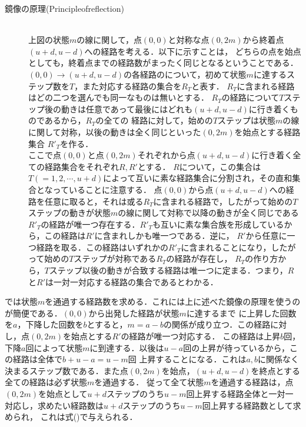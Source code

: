 \documentclass[a4j,papersize,disablejfam,slide,14pt]{jsarticle}
\newcommand{\qed}{%
	\relax\ifmmode
		\eqno{%
		\setlength{\fboxsep}{2pt}\setlength{\fboxrule}{0.3pt}
		\fcolorbox{black}{black}{\rule[2pt]{0pt}{1ex}}}
	\else
		\begingroup
		\setlength{\fboxsep}{2pt}\setlength{\fboxrule}{0.3pt}
		\hfill\fcolorbox{black}{black}{\rule[2pt]{0pt}{1ex}}
		\endgroup
	\fi}
\begin{document}
    \begin{description}
	\item[鏡像の原理{\rm (Principle\quad of\quad reflection)}]\mbox{}\\
    	上図の状態$m$の線に関して，点$(0, 0)$と対称な点$(0, 2m)$から終着点$(u+d,u-d)$への経路を考える．以下に示すことは，
        どちらの点を始点としても，終着点までの経路数がまったく同じとなるということである．\\
    	$(0,0) \to (u+d,u-d)$の各経路のについて，初めて状態$m$に達するステップ数を$T$，また対応する経路の集合を$R_T$と表す．
        $R_T$に含まれる経路はどの二つを選んでも同一なものは無いとする．
    	$R_T$の経路について$T$ステップ後の動きは任意であって最後にはどれも$(u+d, u-d)$に行き着くものであるから，$R_T$の全ての
        経路に対して，始めの$T$ステップは状態$m$の線に関して対称，以後の動きは全く同じといった$(0,2m)$を始点とする経路集合
        $R'_T$を作る．\\
        ここで点$(0, 0)$と点$(0, 2m)$それぞれから点$(u+d,u-d)$に行き着く全ての経路集合をそれぞれ$R,R'$とする．
    	$R$について，この集合は$T(=1,2,\cdots,u+d)$によって互いに素な経路集合に分割され，その直和集合となっていることに注意する．
    	点$(0, 0)$から点$(u+d,u-d)$への経路を任意に取ると，それは或る$R_T$に含まれる経路で，したがって始めの$T$ステップの動きが状態$m$の線に関して対称で以降の動きが全く同じである
    	$R'_T$の経路が唯一つ存在する．$R'_T$も互いに素な集合族を形成しているから，この経路は$R'$に含まれしかも唯一つである．逆に，
    	$R'$から任意に一つ経路を取る．この経路はいずれかの$R'_T$に含まれることになり，したがって始めの$T$ステップが対称である$R_T$の経路が存在し，
    	$R_T$の作り方から，$T$ステップ以後の動きが合致する経路は唯一つに定まる．つまり，$R$と$R'$は一対一対応する経路の集合であるとわかる．\qed
    \end{description}
    
    では状態$m$を通過する経路数を求める．これには上に述べた鏡像の原理を使うのが簡便である．$(0,0)$から出発した経路が状態$m$に達するまで
    に上昇した回数を$a$，下降した回数を$b$とすると，$m = a - b$の関係が成り立つ．この経路に対し，点$(0,2m)$を始点とする$R'$の経路が唯一つ対応する．
    この経路は上昇$b$回，下降$a$回によって状態$m$に到達する．以後は$u-a$回の上昇が待っているから，この経路は全体で$b + u - a = u - m$回
    上昇することになる．これは$a,b$に関係なく決まるステップ数である．また点$(0,2m)$を始点，$(u+d,u-d)$を終点とする全ての経路は必ず状態$m$を通過する．
    従って全て状態$m$を通過する経路は，点$(0,2m)$を始点として$u+d$ステップのうち$u-m$回上昇する経路全体と一対一対応し，求めたい経路数は$u+d$ステップのうち$u-m$回上昇する経路数として求められ，
    これは式()で与えられる．
\end{document}
